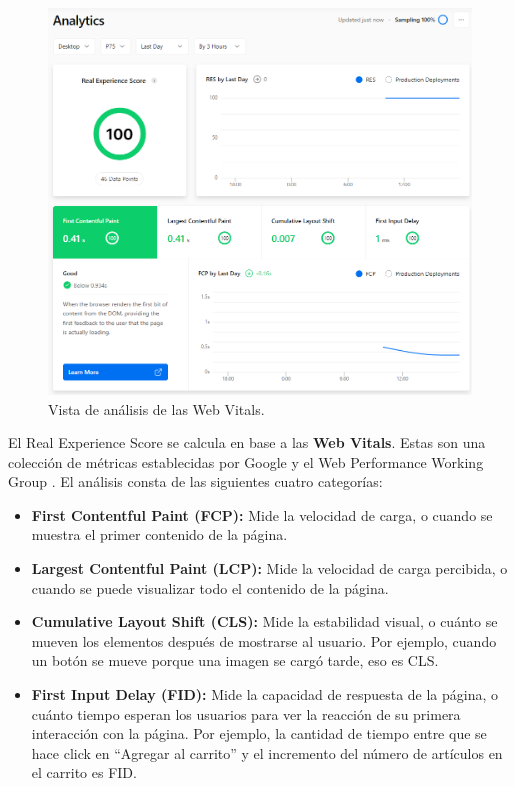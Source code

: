 \documentclass[12pt,twoside,titlepage]{report}
\begin{document}
    \begin{figure}[H]
        \centering
        \includegraphics[scale=0.5]{Vercel/RealExperienceScore}
        \caption{Vista de análisis de las Web Vitals.}
        \label{fig:Vercel_metrics}
    \end{figure}

El Real Experience Score se calcula en base a las \textbf{Web Vitals}. Estas son una colección de métricas establecidas por Google \cite{webdev} y el Web Performance Working Group \cite{w3}. El análisis consta de las siguientes cuatro categorías:
\begin{itemize}
    \item\textbf{First Contentful Paint (FCP):} Mide la velocidad de carga, o cuando se muestra el primer contenido de la página.
    \item\textbf{Largest Contentful Paint (LCP):} Mide la velocidad de carga percibida, o cuando se puede visualizar todo el contenido de la página.
    \item\textbf{Cumulative Layout Shift (CLS):} Mide la estabilidad visual, o cuánto se mueven los elementos después de mostrarse al usuario. Por ejemplo, cuando un botón se mueve porque una imagen se cargó tarde, eso es CLS.
    \item\textbf{First Input Delay (FID):} Mide la capacidad de respuesta de la página, o cuánto tiempo esperan los usuarios para ver la reacción de su primera interacción con la página. Por ejemplo, la cantidad de tiempo entre que se hace click en ``Agregar al carrito'' y el incremento del número de artículos en el carrito es FID.
\end{itemize}
\end{document}

